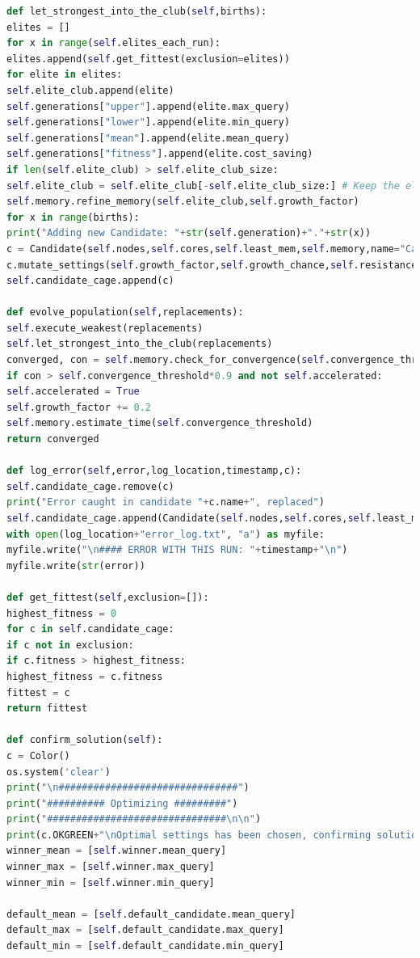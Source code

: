\documentclass[a4paper,english]{report}
\begin{document}
\begin{lstlisting}[language=Python, caption=class\_definition.py\, the file defining all the algorithmic operations done during a optimization process.]
def let_strongest_into_the_club(self,births):
elites = []
for x in range(self.elites_each_run):
elites.append(self.get_fittest(exclusion=elites))
for elite in elites:
self.elite_club.append(elite)
self.generations["upper"].append(elite.max_query)
self.generations["lower"].append(elite.min_query)
self.generations["mean"].append(elite.mean_query)
self.generations["fitness"].append(elite.cost_saving)
if len(self.elite_club) > self.elite_club_size:
self.elite_club = self.elite_club[-self.elite_club_size:] # Keep the elite club at predefined size
self.memory.refine_memory(self.elite_club,self.growth_factor)
for x in range(births):
print("Adding new Candidate: "+str(self.generation)+"."+str(x))
c = Candidate(self.nodes,self.cores,self.least_mem,self.memory,name="Candidate "+str(self.generation)+"."+str(x)) 
c.mutate_settings(self.growth_factor,self.growth_chance,self.resistance)
self.candidate_cage.append(c)

def evolve_population(self,replacements):
self.execute_weakest(replacements)
self.let_strongest_into_the_club(replacements)
converged, con = self.memory.check_for_convergence(self.convergence_threshold)
if con > self.convergence_threshold*0.9 and not self.accelerated:
self.accelerated = True
self.growth_factor += 0.2
self.memory.estimate_time(self.convergence_threshold)
return converged

def log_error(self,error,log_location,timestamp,c):
self.candidate_cage.remove(c)
print("Error caught in candidate "+c.name+", replaced")
self.candidate_cage.append(Candidate(self.nodes,self.cores,self.least_mem,self.memory,name="Candidate "+str(self.generation)+".replacement")) 
with open(log_location+"error_log.txt", "a") as myfile:
myfile.write("\n#### ERROR WITH THIS RUN: "+timestamp+"\n")
myfile.write(str(error))

def get_fittest(self,exclusion=[]):
highest_fitness = 0
for c in self.candidate_cage:
if c not in exclusion:
if c.fitness > highest_fitness:
highest_fitness = c.fitness
fittest = c
return fittest

def confirm_solution(self):
c = Color()
os.system('clear')
print("\n###############################")
print("########## Optimizing #########")
print("###############################\n\n")
print(c.OKGREEN+"\nOptimal settings has been chosen, confirming solution."+c.ENDC)
winner_mean = [self.winner.mean_query]
winner_max = [self.winner.max_query]
winner_min = [self.winner.min_query]

default_mean = [self.default_candidate.mean_query]
default_max = [self.default_candidate.max_query]
default_min = [self.default_candidate.min_query]


\end{lstlisting}
\end{document}
